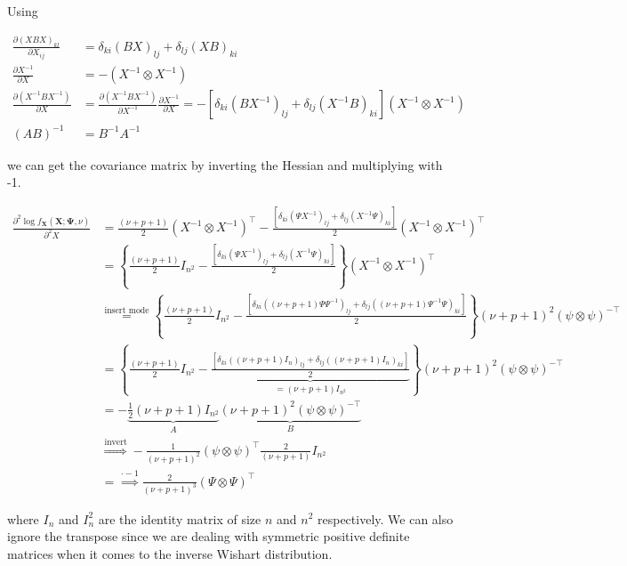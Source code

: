 Using 

\begin{align}
	\frac{\partial(XBX)_{kl}}{\partial X_{ij}} &= \delta_{ki}(BX)_{lj} + \delta_{lj}(XB)_{ki} \\
	\frac{\partial X^{-1}}{\partial X} &= -(X^{-1} \otimes X^{-1}) \\
	\frac{\partial (X^{-1}B X^{-1})}{\partial X} &= \frac{\partial (X^{-1}B X^{-1})}{\partial X^{-1}} \frac{\partial X^{-1}}{\partial X} = -[\delta_{ki}(BX^{-1})_{lj} + \delta_{lj}(X^{-1}B)_{ki}] (X^{-1} \otimes X^{-1})\\
	(AB)^{-1} &= B^{-1} A^{-1}
\end{align}

we can get the covariance matrix by inverting the Hessian and multiplying with -1. 

\begin{align*}
		\frac{\partial^2 \log f_{\mathbf X}({\mathbf X}; {\mathbf \Psi}, \nu)}{\partial^2 X} &= \frac{(\nu + p + 1)}{2}(X^{-1} \otimes X^{-1})^\top - \frac{[\delta_{ki}(\Psi X^{-1})_{lj} + \delta_{lj}(X^{-1}\Psi)_{ki}]}{2} (X^{-1} \otimes X^{-1})^\top \\
		&= \left\{\frac{(\nu + p + 1)}{2} I_{n^2}- \frac{[\delta_{ki}(\Psi X^{-1})_{lj} + \delta_{lj}(X^{-1}\Psi)_{ki}]}{2}\right\} (X^{-1} \otimes X^{-1})^\top \\
		&\overset{\text{insert mode}}{=} \left\{\frac{(\nu + p + 1)}{2} I_{n^2}- \frac{[\delta_{ki}((\nu + p + 1)\Psi \Psi^{-1})_{lj} + \delta_{lj}((\nu + p + 1)\Psi^{-1}\Psi)_{ki}]}{2}\right\} (\nu + p + 1)^2(\psi \otimes \psi)^{-\top} \\
		&= \left\{\frac{(\nu + p + 1)}{2} I_{n^2}- \underbrace{\frac{[\delta_{ki}((\nu + p + 1)I_n)_{lj} + \delta_{lj}((\nu + p + 1)I_n)_{ki}]}{2}}_{=(\nu + p + 1)I_{n^2}}\right\} (\nu + p + 1)^2(\psi \otimes \psi)^{-\top} \\
		&= -\underbrace{\frac{1}{2}(\nu + p + 1) I_{n^2}}_{A} \underbrace{(\nu + p + 1)^2(\psi \otimes \psi)^{-\top}}_{B} \\
		&\overset{\text{invert}}{\Rightarrow} -\frac{1}{(\nu + p + 1)^2}(\psi \otimes \psi)^{\top} \frac{2}{(\nu + p + 1)}I_{n^2} \\
		&=\overset{\cdot -1}{\Rightarrow} \frac{2}{(\nu + p + 1)^3}(\Psi \otimes \Psi)^\top
\end{align*}

where $I_{n}$ and $I_n^2$ are the identity matrix of size $n$ and $n^2$ respectively. We can also ignore the transpose since we are dealing with symmetric positive definite matrices when it comes to the inverse Wishart distribution.

